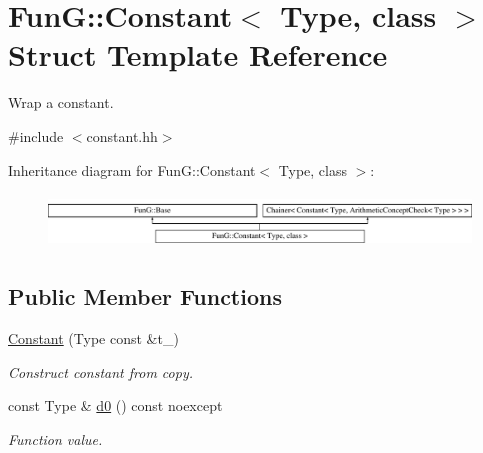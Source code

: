 \hypertarget{structFunG_1_1Constant}{\section{Fun\-G\-:\-:Constant$<$ Type, class $>$ Struct Template Reference}
\label{structFunG_1_1Constant}
}


Wrap a constant.  




{\ttfamily \#include $<$constant.\-hh$>$}

Inheritance diagram for Fun\-G\-:\-:Constant$<$ Type, class $>$\-:\begin{figure}[H]
\begin{center}
\leavevmode
\includegraphics[height=1.435897cm]{structFunG_1_1Constant}
\end{center}
\end{figure}
\subsection*{Public Member Functions}
\begin{DoxyCompactItemize}
\item 
\hypertarget{structFunG_1_1Constant_a310783597f488e554de12627bf56aec8}{\hyperlink{structFunG_1_1Constant_a310783597f488e554de12627bf56aec8}{Constant} (Type const \&t\-\_\-)}\label{structFunG_1_1Constant_a310783597f488e554de12627bf56aec8}

\begin{DoxyCompactList}\small\item\em Construct constant from copy. \end{DoxyCompactList}\item 
\hypertarget{structFunG_1_1Constant_aad514a9470fbe1c47c0f07da6e160416}{const Type \& \hyperlink{structFunG_1_1Constant_aad514a9470fbe1c47c0f07da6e160416}{d0} () const noexcept}\label{structFunG_1_1Constant_aad514a9470fbe1c47c0f07da6e160416}

\begin{DoxyCompactList}\small\item\em Function value. \end{DoxyCompactList}\end{DoxyCompactItemize}


